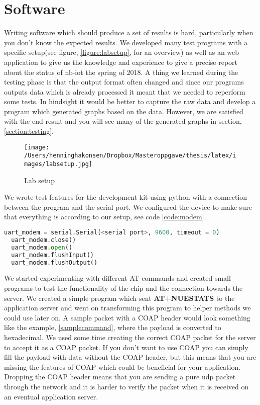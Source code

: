 \documentclass[USenglish]{ifimaster}  %
\begin{document}
\section{Software}
Writing software which should produce a set of results is hard, particularly when you don't know the expected results. We developed many test programs with a specific setup(see figure, \vref{figure:labsetup}, for an overview) as well as an web application to give us the knowledge and experience to give a precise report about the status of \acrshort{nb-iot} the spring of 2018. A thing we learned during the testing phase is that the output format often changed and since our programs outputs data which is already processed it meant that we needed to reperform some tests. In hindsight it would be better to capture the raw data and develop a program which generated graphs based on the data. However, we are satisfied with the end result and you will see many of the generated graphs in section, \vref{section:testing}.

\begin{figure}[ht]
  \centering\texttt{[image: /Users/henninghakonsen/Dropbox/Masteroppgave/thesis/latex/images/labsetup.jpg]}
  \caption{Lab setup \cite{pcpng35052:online} \cite{fluke88435:online} \cite{ingagrue31:online}}
  \label{figure:labsetup}
\end{figure}

We wrote test features for the development kit using python with a connection between the program and the serial port. We configured the device to make sure that everything is according to our setup, see code \vref{code:modem}.

\begin{lstlisting}[caption={Development kit initiation},label={code:modem},language=Python]
  uart_modem = serial.Serial(<serial port>, 9600, timeout = 0)
  uart_modem.close()
  uart_modem.open()
  uart_modem.flushInput()
  uart_modem.flushOutput()
\end{lstlisting}

We started experimenting with different AT commands and created small programs to test the functionality of the chip and the connection towards the server. We created a simple program which sent \textbf{AT+NUESTATS} to the application server and went on transforming this program to helper methods we could use later on. A sample packet with a COAP header would look something like the example, \vref{samplecommand}, where the payload is converted to hexadecimal. We used some time creating the correct COAP packet for the server to accept it as a COAP packet. If you don't want to use COAP you can simply fill the payload with data without the COAP header, but this means that you are missing the features of COAP which could be beneficial for your application. Dropping the COAP header means that you are sending a pure \acrshort{udp} packet through the network and it is harder to verify the packet when it is received on an eventual application server.
\end{document}
